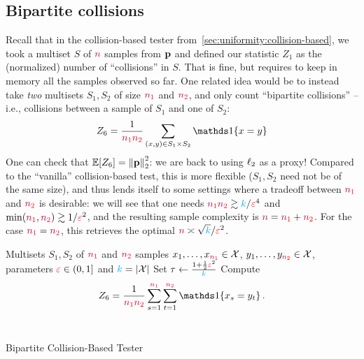 \subsection{Bipartite collisions} 
  \label{sec:uniformity:bipartite}
Recall that in the collision-based tester from~\cref{sec:uniformity:collision-based}, we took a multiset $S$ of $\ns$ samples from $\p$ and defined our statistic $Z_1$ as the (normalized) number of ``collisions'' in $S$. That is fine, but requires to keep in memory all the samples observed so far. One related idea would be to instead take \emph{two} multisets $S_1,S_2$ of size $\nss$ and $\nst$, and only count ``bipartite collisions'' -- i.e., collisions between a sample of $S_1$ and one of $S_2$:
\begin{equation}
    Z_6 = \frac{1}{\nss \nst}\sum_{(x,y)\in S_1\times S_2} \indic{x=y}
\end{equation}
One can check that $\expect{Z_6} = \normtwo{\p}^2$: we are back to using $\lp[2]$ as a proxy! Compared to the ``vanilla'' collision-based test, this is more flexible ($S_1,S_2$ need not be of the same size), and thus lends itself to some settings where a tradeoff between $\nss$ and $\nst$ is desirable: we will see that one needs $\nss\nst \gtrsim \ab/\dst^4$ and $\min(\nss,\nst)\gtrsim 1/\dst^2$, and the resulting sample complexity is $\ns=\nss+\nst$. For the case $\nss=\nst$, this retrieves the optimal $\ns \asymp \sqrt{\ab}/\dst^2$.

\begin{algorithm}[ht!]
  \begin{algorithmic}[1]
    \Require Multisets $S_1, S_2$ of $\nss$ and $\nst$ samples $x_1,\dots,x_{\nss}\in \domain$, $y_1,\dots,y_{\nst}\in \domain$, parameters $\dst\in(0,1]$ and $\ab = \abs{\domain}$
    \State Set $\tau \gets \frac{1+\frac{1}{2}\dst^2}{\ab}$
    \State Compute 
    \[
        Z_6 = \frac{1}{\nss\nst} \sum_{s=1}^{\nss}\sum_{t=1}^{\nst} \indic{x_s=y_t}\,.
    \]
     \Return \reject {}
    \Else\ 
      \Return \accept {}
    \EndIf
  \end{algorithmic}
  \caption{\label{algo:bipartite:collision-based}\sc Bipartite Collision-Based Tester}
\end{algorithm}

